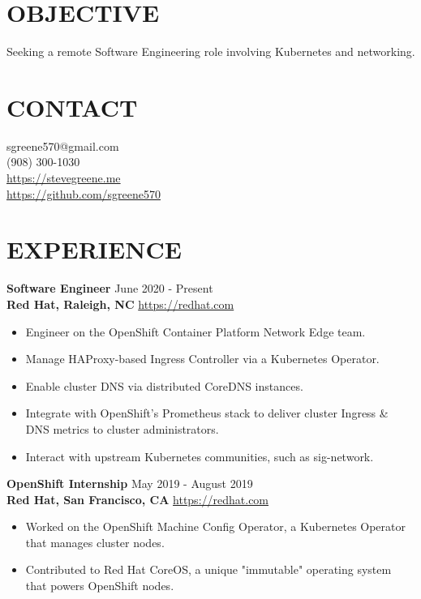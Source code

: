 \documentclass[line, margin, 11pt]{res}
\begin{document}

\begin{resume}

\section{\small OBJECTIVE}
Seeking a remote Software Engineering role involving Kubernetes and networking.

\section{\small CONTACT}
sgreene570@gmail.com \\
(908) 300-1030 \\
\url{https://stevegreene.me} \\
\url{https://github.com/sgreene570}

\section{\small EXPERIENCE}
{\bf \large{Software Engineer}} \hfill June 2020 - Present \\
{\bf Red Hat, Raleigh, NC} \hfill \url{https://redhat.com}
\begin{itemize}
    \item Engineer on the OpenShift Container Platform Network Edge team.
    \item Manage HAProxy-based Ingress Controller via a Kubernetes Operator.
    \item Enable cluster DNS via distributed CoreDNS instances.
    \item Integrate with OpenShift's Prometheus stack to deliver cluster Ingress \& DNS metrics to cluster administrators.
    \item Interact with upstream Kubernetes communities, such as sig-network.
\end{itemize}


{\bf \large{OpenShift Internship}} \hfill May 2019 - August 2019 \\
{\bf Red Hat, San Francisco, CA} \hfill \url{https://redhat.com}
\begin{itemize}
    \item Worked on the OpenShift Machine Config Operator, a Kubernetes Operator that manages cluster nodes.
    \item Contributed to Red Hat CoreOS, a unique "immutable" operating system that powers OpenShift nodes.
\end{itemize}



\end{resume}
\end{document}
